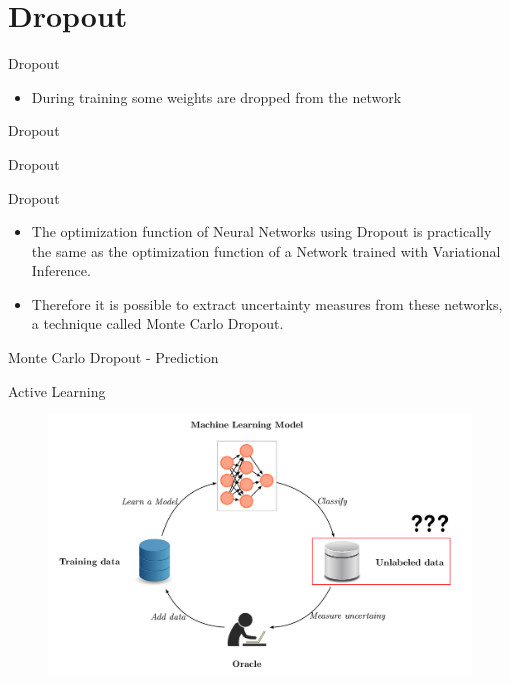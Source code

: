\documentclass[10pt]{beamer}
\begin{document}
\section{Dropout}

\begin{frame}[fragile]{Dropout}
\begin{itemize}
\item During training some weights are dropped from the network
\end{itemize}
\end{frame}

\begin{frame}[fragile]{Dropout}
    
\end{frame}

\begin{frame}[fragile]{Dropout}
    
\end{frame}

\begin{frame}[fragile]{Dropout}
\begin{itemize}
    \item The optimization function of Neural Networks using \alert{Dropout} is practically the same
        as the optimization function of a Network trained with Variational
        Inference.
    \vspace{0.5cm}
    \item Therefore it is possible to extract uncertainty measures from these
        networks, a technique called \alert{Monte Carlo Dropout}.
\end{itemize}
\end{frame}

\begin{frame}[fragile]{Monte Carlo Dropout - Prediction}
    
\end{frame}

\begin{frame}[fragile]{Active Learning}
    \begin{figure}[htp]
        \centering
        \includegraphics[scale=0.3]{images/active_learning_uncertainty.png}
    \end{figure}
\end{frame}
\end{document}

